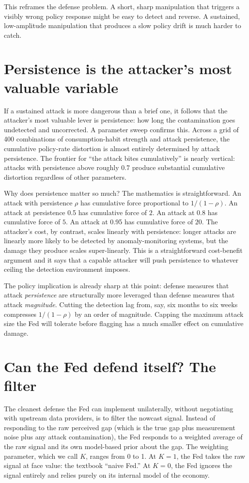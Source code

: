 \documentclass[12pt]{article}
\begin{document}
This reframes the defense problem. A short, sharp manipulation that triggers a visibly wrong policy response might be easy to detect and reverse. A sustained, low-amplitude manipulation that produces a slow policy drift is much harder to catch.

\section{Persistence is the attacker's most valuable variable}

If a sustained attack is more dangerous than a brief one, it follows that the attacker's most valuable lever is persistence: how long the contamination goes undetected and uncorrected. A parameter sweep confirms this. Across a grid of 400 combinations of consumption-habit strength and attack persistence, the cumulative policy-rate distortion is almost entirely determined by attack persistence. The frontier for ``the attack bites cumulatively'' is nearly vertical: attacks with persistence above roughly 0.7 produce substantial cumulative distortion regardless of other parameters.

Why does persistence matter so much? The mathematics is straightforward. An attack with persistence $\rho$ has cumulative force proportional to $1/(1-\rho)$. An attack at persistence 0.5 has cumulative force of $2$. An attack at 0.8 has cumulative force of $5$. An attack at 0.95 has cumulative force of $20$. The attacker's cost, by contrast, scales linearly with persistence: longer attacks are linearly more likely to be detected by anomaly-monitoring systems, but the damage they produce scales super-linearly. This is a straightforward cost-benefit argument and it says that a capable attacker will push persistence to whatever ceiling the detection environment imposes.

The policy implication is already sharp at this point: defense measures that attack \emph{persistence} are structurally more leveraged than defense measures that attack \emph{magnitude}. Cutting the detection lag from, say, six months to six weeks compresses $1/(1-\rho)$ by an order of magnitude. Capping the maximum attack size the Fed will tolerate before flagging has a much smaller effect on cumulative damage.

\section{Can the Fed defend itself? The filter}

The cleanest defense the Fed can implement unilaterally, without negotiating with upstream data providers, is to filter the nowcast signal. Instead of responding to the raw perceived gap (which is the true gap plus measurement noise plus any attack contamination), the Fed responds to a weighted average of the raw signal and its own model-based prior about the gap. The weighting parameter, which we call $K$, ranges from 0 to 1. At $K=1$, the Fed takes the raw signal at face value: the textbook ``naive Fed.'' At $K=0$, the Fed ignores the signal entirely and relies purely on its internal model of the economy.
\end{document}
